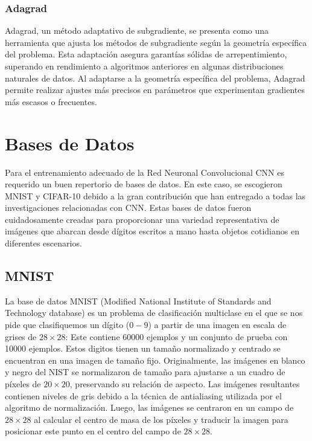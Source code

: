 \documentclass[journal]{IEEEtai}
\begin{document}
\subsubsection{\textbf{Adagrad}} Adagrad, un método adaptativo de subgradiente, se presenta como una herramienta que ajusta los métodos de subgradiente según la geometría específica del problema. Esta adaptación asegura garantías sólidas de arrepentimiento, superando en rendimiento a algoritmos anteriores en algunas distribuciones naturales de datos. Al adaptarse a la geometría específica del problema, Adagrad permite realizar ajustes más precisos en parámetros que experimentan gradientes más escasos o frecuentes.

\section{Bases de Datos}

Para el entrenamiento adecuado de la Red Neuronal Convolucional CNN es requerido un buen repertorio de bases de datos. En este caso, se escogieron MNIST \cite{MNIST} y CIFAR-10 \cite{CIFAR10} debido a la gran contribución que han entregado a todas las investigaciones relacionadas con CNN. Estas bases de datos fueron cuidadosamente creadas para proporcionar una variedad representativa de imágenes que abarcan desde dígitos escritos a mano hasta objetos cotidianos en diferentes escenarios. 

\subsection{MNIST}

La base de datos MNIST (Modified National Institute of Standards and Technology database) es un problema de clasificación multiclase en el que se nos pide que clasifiquemos un dígito ($0-9$) a partir de una imagen en escala de grises de $28\times 28$:
Este contiene 60000 ejemplos y un conjunto de prueba con 10000 ejemplos. Estos digitos tienen un tamaño normalizado y centrado se encuentran en una imagen de tamaño fijo. Originalmente, las imágenes en blanco y negro del NIST se normalizaron de tamaño para ajustarse a un cuadro de píxeles de $20 \times 20$, preservando su relación de aspecto. Las imágenes resultantes contienen niveles de gris debido a la técnica de antialiasing utilizada por el algoritmo de normalización. Luego, las imágenes se centraron en un campo de $28 \times 28$ al calcular el centro de masa de los píxeles y traducir la imagen para posicionar este punto en el centro del campo de $28 \times 28$.
\end{document}
